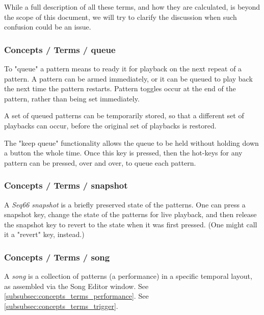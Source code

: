    While a full description of all these terms, and how they are calculated, is
   beyond the scope of this document, we will try to clarify the discussion
   when such confusion could be an issue.

\subsubsection{Concepts / Terms / queue}
\label{subsubsec:concepts_terms_queue_mode}

   To "queue" a pattern means to ready it for playback on the next repeat of
   a pattern.  A pattern can be armed immediately, or it can be queued to
   play back the next time the pattern restarts.
   Pattern toggles occur at the end of
   the pattern, rather than being set immediately.

   A set of queued patterns can be temporarily stored, so that a different
   set of playbacks can occur, before the original set of playbacks is
   restored.

   The "keep queue" functionality allows the queue to be held without
   holding down a button the whole time.  Once this key is pressed,
   then the hot-keys for any pattern can be pressed, over and over,
   to queue each pattern.

\subsubsection{Concepts / Terms / snapshot}
\label{subsubsec:concepts_terms_snapshot}

   A \textsl{Seq66} \textsl{snapshot} is a briefly preserved
   state of the patterns.  One can press a snapshot key, change the state of
   the patterns for live playback, and then release the snapshot key to
   revert to the state when it was first pressed.  (One might call it a
   "revert" key, instead.)

\subsubsection{Concepts / Terms / song}
\label{subsubsec:concepts_terms_song}

   A \textsl{song} is a collection of patterns (a performance)
   in a specific temporal layout, as assembled via the Song Editor window.
   See \ref{subsubsec:concepts_terms_performance}.
   See \ref{subsubsec:concepts_terms_trigger}.

